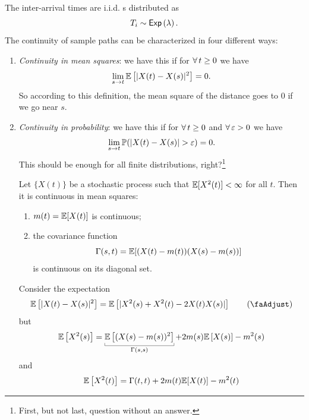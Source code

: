 \documentclass{report}
\begin{document}
	The inter-arrival times are i.i.d. \rv s distributed as
	\begin{equation*}
		T_i\sim\mathsf{Exp}\left(\lambda\right).
	\end{equation*}
	The continuity of sample paths can be characterized in four different ways:
	\begin{enumerate}
		\item \emph{Continuity in mean squares}: we have this if for $\forall\, t\geq0$ we have
		\begin{equation*}
			\lim_{s\to t}\mathbb{E}\left[|X(t)-X(s)|^{2}\right]=0.
		\end{equation*}
		So according to this definition, the mean square of the distance goes to 0 if we go near $s$.
		\item \emph{Continuity in probability}: we have this if for $\forall\, t\geq0$ and $\forall\,\varepsilon>0$ we have
		\begin{equation*}
			\lim_{s\to t}\pr(|X(t)-X(s)|>\varepsilon)=0.
		\end{equation*}
		This should be enough for all finite distributions, right?\footnote{First, but not last, question without an answer.}
		\begin{theorem}
			Let $\{X(t)\}$ be a stochastic process such that $\mathbb{E}[X^{2}(t)]<\infty$ for all $t$. Then it is continuous in mean squares\ifonly{}:
			\begin{enumerate}
				\item $m(t)=\mathbb{E}[X(t)]$ is continuous;
				\item the covariance function
				\begin{equation*}
					\Gamma(s,t)=\mathbb{E}[(X(t)-m(t))(X(s)-m(s))]
				\end{equation*}
				is continuous on its diagonal set.
			\end{enumerate}
			\begin{fancyproof}
				Consider the expectation
				\begin{equation*}
					\ev\left[|X(t)-X(s)|^{2}\right]=\ev\left[|X^{2}(s)+X^{2}(t)-2X(t)X(s)|\right]\tag{\faAdjust}\label{boh}
				\end{equation*}
				but
				\begin{equation*}
					\ev\left[X^{2}(s)\right]=\ubracketthin{\ev\left[(X(s)-m(s))^{2}\right]}_{\Gamma(s,s)}+2m(s)\ev\left[X(s)\right]-m^{2}(s)
				\end{equation*}
				and
				\begin{equation*}
					\mathbb{E}\left[X^{2}(t)\right]=\Gamma(t,t)+2m(t)\mathbb{E}[X(t)]-m^{2}(t)
				\end{equation*}

\end{fancyproof}
\end{theorem}
\end{enumerate}
\end{document}
